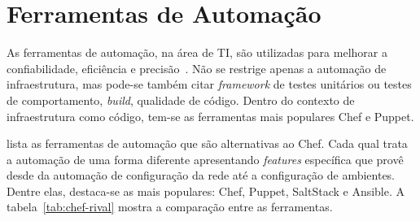 \section{Ferramentas de Automação}
\label{sec:ferramenta_automacao}

As ferramentas de automação, na área de TI, são utilizadas para melhorar
a confiabilidade, eficiência e precisão~\cite{sharma:2015}. Não se restrige
apenas a automação de infraestrutura, mas pode-se também citar \textit{framework}
de testes unitários ou testes de comportamento, \textit{build}, qualidade de código.
Dentro do contexto de infraestrutura como código, tem-se as ferramentas
mais populares Chef e Puppet.

 lista as ferramentas de automação que são alternativas ao
Chef. Cada qual trata a automação de uma forma diferente apresentando \textit{features}
específica que provê desde da automação de configuração da rede até a configuração
de ambientes. Dentre elas, destaca-se as mais populares: Chef, Puppet,
SaltStack e Ansible. A tabela~\ref{tab:chef-rival} mostra a comparação entre
as ferramentas.  
